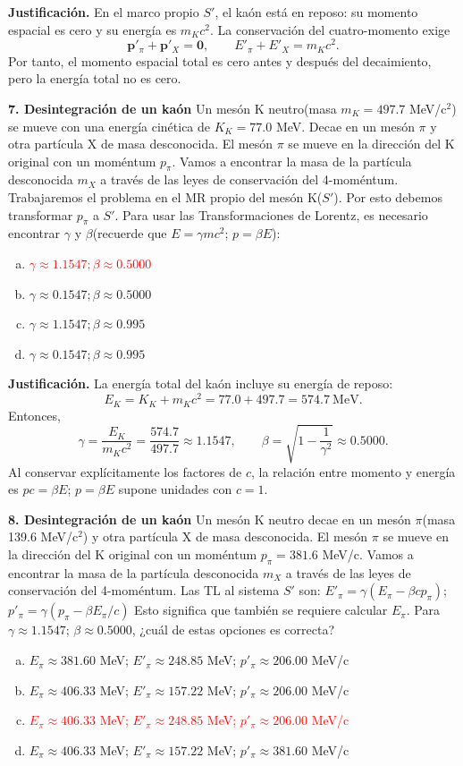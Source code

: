 \textbf{Justificación.} En el marco propio $S'$, el kaón está en reposo: su momento espacial es cero y su energía es $m_Kc^2$. La conservación del cuatro-momento exige
\[
\mathbf{p}'_\pi+\mathbf{p}'_X=\mathbf{0},
\qquad E'_\pi+E'_X=m_Kc^2.
\]
Por tanto, el momento espacial total es cero antes y después del decaimiento, pero la energía total no es cero.

\textbf{7. Desintegración de un kaón}
Un mesón K neutro(masa $m_K= 497.7$ MeV/c$^2$) se mueve con una energía cinética de $K_K= 77.0$ MeV. Decae en un mesón $\pi$ y otra partícula X de masa desconocida. El mesón $\pi$ se mueve en la dirección del K original con un moméntum $p_\pi$. Vamos a encontrar la masa de la partícula desconocida $m_X$ a través de las leyes de conservación del 4-moméntum.
Trabajaremos el problema en el MR propio del mesón K($S'$). Por esto debemos transformar $p_\pi$ a $S'$.
Para usar las Transformaciones de Lorentz, es necesario encontrar $\gamma$ y $\beta$(recuerde que $E= \gamma mc^2$; $p= \beta E$):
\begin{enumerate}[a)]
    \item \textcolor{red}{$\gamma \approx 1.1547; \beta \approx 0.5000$}
    \item $\gamma \approx 0.1547; \beta \approx 0.5000$
    \item $\gamma \approx 1.1547; \beta \approx 0.995$
    \item $\gamma \approx 0.1547; \beta \approx 0.995$
\end{enumerate}

\textbf{Justificación.} La energía total del kaón incluye su energía de reposo:
\[
E_K=K_K+m_Kc^2=77.0+497.7=574.7\ \mathrm{MeV}.
\]
Entonces,
\[
\gamma=\frac{E_K}{m_Kc^2}=\frac{574.7}{497.7}\approx1.1547,
\qquad \beta=\sqrt{1-\frac{1}{\gamma^2}}\approx0.5000.
\]
Al conservar explícitamente los factores de $c$, la relación entre momento y energía es $pc=\beta E$; $p=\beta E$ supone unidades con $c=1$.

\textbf{8. Desintegración de un kaón}
Un mesón K neutro decae en un mesón $\pi$(masa 139.6 MeV/c$^2$) y otra partícula X de masa desconocida. El mesón $\pi$ se mueve en la dirección del K original con un moméntum $p_\pi= 381.6$ MeV/c. Vamos a encontrar la masa de la partícula desconocida $m_X$ a través de las leyes de conservación del 4-moméntum.
Las TL al sistema $S'$ son:
$E'_\pi= \gamma(E_\pi - \beta c p_\pi)$; $p'_\pi= \gamma(p_\pi - \beta E_\pi/c)$
Esto significa que también se requiere calcular $E_\pi$. Para $\gamma \approx 1.1547$; $\beta \approx 0.5000$, ¿cuál de estas opciones es correcta?
\begin{enumerate}[a)]
    \item $E_\pi \approx 381.60$ MeV; $E'_\pi \approx 248.85$ MeV; $p'_\pi \approx 206.00$ MeV/c
    \item $E_\pi \approx 406.33$ MeV; $E'_\pi \approx 157.22$ MeV; $p'_\pi \approx 206.00$ MeV/c
    \item \textcolor{red}{$E_\pi \approx 406.33$ MeV; $E'_\pi \approx 248.85$ MeV; $p'_\pi \approx 206.00$ MeV/c}
    \item $E_\pi \approx 406.33$ MeV; $E'_\pi \approx 157.22$ MeV; $p'_\pi \approx 381.60$ MeV/c
\end{enumerate}

